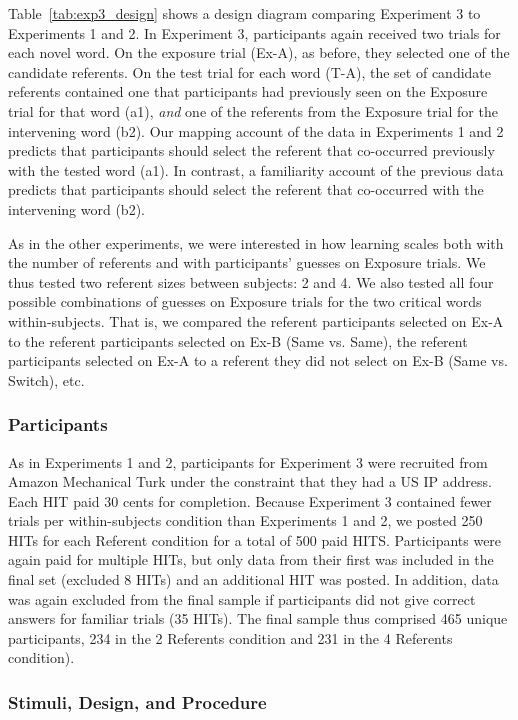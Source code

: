 \documentclass[authoryear,review]{elsarticle}
\begin{document}
Table~\ref{tab:exp3_design} shows a design diagram comparing Experiment 3 to Experiments 1 and 2. In Experiment 3, participants again received two trials for each novel word. On the exposure trial (Ex-A), as before, they selected one of the candidate referents. On the test trial for each word (T-A), the set of candidate referents contained one that participants had previously seen on the Exposure trial for that word (a1), \emph{and} one of the referents from the Exposure trial for the intervening word (b2). Our mapping account of the data in Experiments 1 and 2 predicts that participants should select the referent that co-occurred previously with the tested word (a1). In contrast, a familiarity account of the previous data predicts that participants should select the referent that co-occurred with the intervening word (b2).

As in the other experiments, we were interested in how learning scales both with the number of referents and with participants' guesses on Exposure trials. We thus tested two referent sizes between subjects: 2 and 4. We also tested all four possible combinations of guesses on Exposure trials for the two critical words within-subjects. That is, we compared the referent participants selected on Ex-A to the referent participants selected on Ex-B (Same vs. Same), the referent participants selected on Ex-A to a referent they did not select on Ex-B (Same vs. Switch), etc. 

\subsubsection{Participants}

As in Experiments 1 and 2, participants for Experiment 3 were recruited from Amazon Mechanical Turk under the constraint that they had a US IP address. Each HIT paid 30 cents for completion. Because Experiment 3 contained fewer trials per within-subjects condition than Experiments 1 and 2, we posted 250 HITs for each Referent condition for a total of 500 paid HITS. Participants were again paid for multiple HITs, but only data from their first was included in the final set (excluded 8 HITs) and an additional HIT was posted. In addition, data was again excluded from the final sample if participants did not give correct answers for familiar trials (35 HITs). The final sample thus comprised 465 unique participants, 234 in the 2 Referents condition and 231 in the 4 Referents condition).

\subsubsection{Stimuli, Design, and Procedure}
\end{document}
